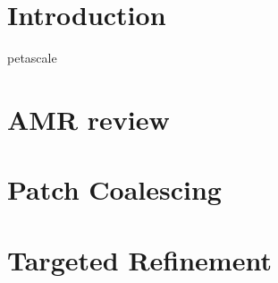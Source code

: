 \documentclass{article}
\begin{document}

\section{Introduction} \label{s:intro}
petascale

\section{AMR review} \label{s:intro}

\section{Patch Coalescing} \label{s:intro}

% 

%
%   
%     


\section{Targeted Refinement} \label{s:intro}

\end{document}
